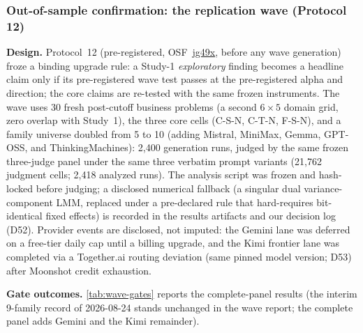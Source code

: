 \documentclass[12pt,a4paper]{article}
\begin{document}
\subsubsection{Out-of-sample confirmation: the replication wave (Protocol 12)}\label{sec:wave}

\textbf{Design.} Protocol~12 (pre-registered, OSF~\href{https://osf.io/jg49x}{jg49x},
before any wave generation) froze a binding upgrade rule: a Study-1
\emph{exploratory} finding becomes a headline claim only if its pre-registered
wave test passes at the pre-registered alpha and direction; the core claims are
re-tested with the same frozen instruments. The wave uses 30 fresh post-cutoff
business problems (a second $6 \times 5$ domain grid, zero overlap with
Study~1), the three core cells (C-S-N, C-T-N, F-S-N), and a family universe
doubled from 5 to 10 (adding Mistral, MiniMax, Gemma, GPT-OSS, and
ThinkingMachines): 2{,}400 generation runs, judged by the same frozen
three-judge panel under the same three verbatim prompt variants
(21{,}762 judgment cells; 2{,}418 analyzed runs). The analysis script was
frozen and hash-locked before judging; a disclosed numerical fallback (a
singular dual variance-component LMM, replaced under a pre-declared rule that
hard-requires bit-identical fixed effects) is recorded in the results artifacts
and our decision log (D52). Provider events are disclosed, not imputed: the
Gemini lane was deferred on a free-tier daily cap until a billing upgrade, and
the Kimi frontier lane was completed via a Together.ai routing deviation
(same pinned model version; D53) after Moonshot credit exhaustion.

\textbf{Gate outcomes.} \cref{tab:wave-gates} reports the complete-panel
results (the interim 9-family record of 2026-08-24 stands unchanged in the
wave report; the complete panel adds Gemini and the Kimi remainder).
\end{document}
